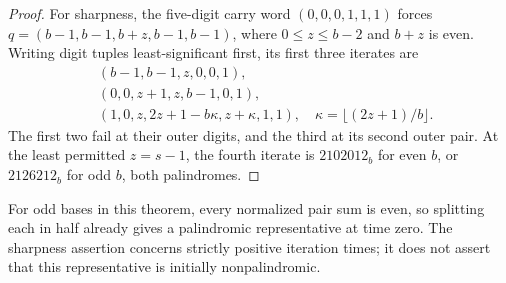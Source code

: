 \documentclass[11pt]{article}
\begin{document}
\begin{proof}
For sharpness, the five-digit carry word $(0,0,0,1,1,1)$ forces
$q=(b-1,b-1,b+z,b-1,b-1)$, where $0\leq z\leq b-2$ and $b+z$ is even.
Writing digit tuples least-significant first, its first three iterates are
\[
\begin{aligned}
 &(b-1,b-1,z,0,0,1),\\
 &(0,0,z+1,z,b-1,0,1),\\
 &(1,0,z,2z+1-b\kappa,z+\kappa,1,1),
 \quad \kappa=\lfloor(2z+1)/b\rfloor.
\end{aligned}
\]
The first two fail at their outer digits, and the third at its second
outer pair. At the least permitted $z=s-1$, the fourth iterate is
$2102012_b$ for even $b$, or $2126212_b$ for odd $b$, both palindromes.
\end{proof}
For odd bases in this theorem, every normalized pair sum is even, so splitting
each in half already gives a palindromic representative at time zero.
The sharpness assertion concerns strictly positive iteration times; it does
not assert that this representative is initially nonpalindromic.
\end{document}
